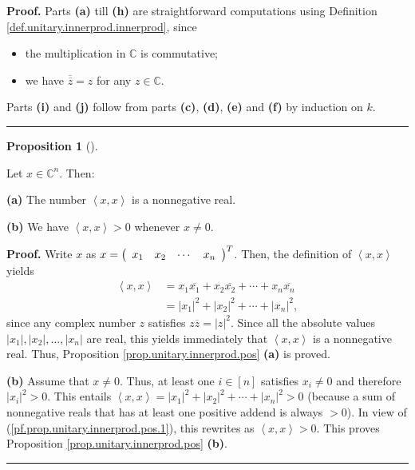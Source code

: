 \documentclass[numbers=enddot,12pt,final,onecolumn,notitlepage]{scrartcl}%
\numberwithin{exer}{subsection}
\theoremstyle{definition}
\newtheorem{prop}[theo]{Proposition}
\newenvironment{proposition}[1][]
{\begin{prop}[#1]\begin{leftbar}}
{\end{leftbar}\end{prop}}
\newenvironment{proof}[1][Proof]{\noindent\textbf{#1.} }{\ \rule{0.5em}{0.5em}}
\begin{document}
\begin{proof}
Parts \textbf{(a)} till \textbf{(h)} are straightforward computations using
Definition \ref{def.unitary.innerprod.innerprod}, since

\begin{itemize}
\item the multiplication in $\mathbb{C}$ is commutative;

\item we have $\overline{\overline{z}}=z$ for any $z\in\mathbb{C}$.
\end{itemize}

Parts \textbf{(i)} and \textbf{(j)} follow from parts \textbf{(c)},
\textbf{(d)}, \textbf{(e)} and \textbf{(f)} by induction on $k$.
\end{proof}

\begin{proposition}
\label{prop.unitary.innerprod.pos}Let $x\in\mathbb{C}^{n}$. Then: \medskip

\textbf{(a)} The number $\left\langle x,x\right\rangle $ is a nonnegative
real. \medskip

\textbf{(b)} We have $\left\langle x,x\right\rangle >0$ whenever $x\neq0$.
\end{proposition}

\begin{proof}
Write $x$ as $x=\left(
\begin{array}
[c]{cccc}%
x_{1} & x_{2} & \cdots & x_{n}%
\end{array}
\right)  ^{T}$. Then, the definition of $\left\langle x,x\right\rangle $
yields%
\begin{align}
\left\langle x,x\right\rangle  &  =x_{1}\overline{x_{1}}+x_{2}\overline{x_{2}%
}+\cdots+x_{n}\overline{x_{n}}\nonumber\\
&  =\left\vert x_{1}\right\vert ^{2}+\left\vert x_{2}\right\vert ^{2}%
+\cdots+\left\vert x_{n}\right\vert ^{2},
\label{pf.prop.unitary.innerprod.pos.1}%
\end{align}
since any complex number $z$ satisfies $z\overline{z}=\left\vert z\right\vert
^{2}$. Since all the absolute values $\left\vert x_{1}\right\vert ,\left\vert
x_{2}\right\vert ,\ldots,\left\vert x_{n}\right\vert $ are real, this yields
immediately that $\left\langle x,x\right\rangle $ is a nonnegative real. Thus,
Proposition \ref{prop.unitary.innerprod.pos} \textbf{(a)} is proved. \medskip

\textbf{(b)} Assume that $x\neq0$. Thus, at least one $i\in\left[  n\right]  $
satisfies $x_{i}\neq0$ and therefore $\left\vert x_{i}\right\vert ^{2}>0$.
This entails $\left\langle x,x\right\rangle =\left\vert x_{1}\right\vert
^{2}+\left\vert x_{2}\right\vert ^{2}+\cdots+\left\vert x_{n}\right\vert
^{2}>0$ (because a sum of nonnegative reals that has at least one positive
addend is always $>0$). In view of (\ref{pf.prop.unitary.innerprod.pos.1}),
this rewrites as $\left\langle x,x\right\rangle >0$. This proves Proposition
\ref{prop.unitary.innerprod.pos} \textbf{(b)}.
\end{proof}
\end{document}
